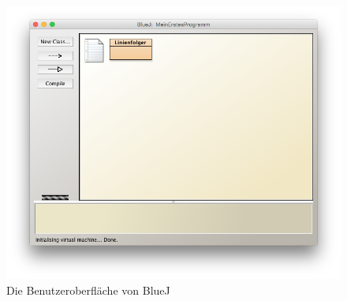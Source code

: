 \documentclass[paper=a4, DIV=13, BCOR=12mm, twoside=on, onecolumn=on, open = any, titlepage =on, parskip =half-, headsepline = on, footsepline = on, chapterprefix = on, sectionprefix = on, appendixprefix = off, fontsize = 11pt, numbers = noenddot, abstract = off]{scrreprt}
\begin{document}

\begin{figure}[htb]
\centering
\includegraphics[width=\textwidth]{images/firstprogram.png}
\caption{Die Benutzeroberfläche von BlueJ}
\label{fig:BlueJ UI}
\end{figure}


\onehalfspacing
\end{document}
